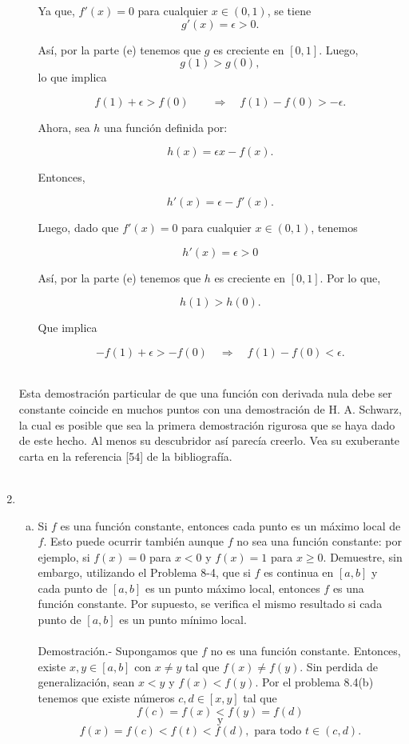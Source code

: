 \begin{enumerate}[\bfseries 1.]
\begin{enumerate}[(a)]
		Ya que, $f'(x)=0$ para cualquier $x\in (0,1)$, se tiene
		$$g'(x)=\epsilon >0.$$

		Así, por la parte (e) tenemos que $g$ es creciente en $[0,1]$. Luego, 
		$$g(1)>g(0),$$
		lo que implica

		$$f(1)+\epsilon>f(0) \qquad \Rightarrow \quad f(1)-f(0)>-\epsilon.$$

		Ahora, sea $h$ una función definida por:

		$$h(x)=\epsilon x- f(x).$$

		Entonces, 

		$$h'(x)=\epsilon-f'(x).$$

		Luego, dado que $f'(x)=0$ para cualquier $x\in (0,1)$, tenemos

		$$h'(x)=\epsilon>0$$

		Así, por la parte (e) tenemos que $h$ es creciente en $[0,1]$. Por lo que,

		$$h(1)>h(0).$$
		
		Que implica

		$$-f(1)+\epsilon>-f(0)\quad \Rightarrow \quad f(1)-f(0)<\epsilon.$$\\

	\end{enumerate}

 	Esta demostración particular de que una función con derivada nula debe ser constante coincide en muchos puntos con una demostración de H. A. Schwarz, la cual es posible que sea la primera demostración rigurosa que se haya dado de este hecho. Al menos su descubridor así parecía creerlo. Vea su exuberante carta en la referencia [54] de la bibliografía.\\\\

    \item 
	\begin{enumerate}[(a)]

	    \item Si $f$ es una función constante, entonces cada punto es un máximo local de $f$. Esto puede ocurrir también aunque $f$ no sea una función constante: por ejemplo, si $f(x)=0$ para $x<0$ y $f(x)=1$ para $x\geq 0$. Demuestre, sin embargo, utilizando el Problema 8-4, que si $f$ es continua en $[a,b]$ y cada punto de $[a,b]$ es un punto máximo local, entonces $f$ es una función constante. Por supuesto, se verifica el mismo resultado si cada punto de $[a,b]$ es un punto mínimo local.\\\\
		Demostración.-\; Supongamos que $f$ no es una función constante. Entonces, existe $x,y\in [a,b]$ con $x\neq y$ tal que $f(x)\neq f(y)$. Sin perdida de generalización, sean $x<y$ y $f(x)<f(y)$. Por el problema 8.4(b) tenemos que existe números $c,d\in [x,y]$ tal que
		$$f(c)=f(x)<f(y)=f(d)$$
		$$\mbox{y}$$
		$$f(x)=f(c)<f(t)<f(d), \mbox{ para todo } t\in (c,d).$$


\end{enumerate}
\end{enumerate}
